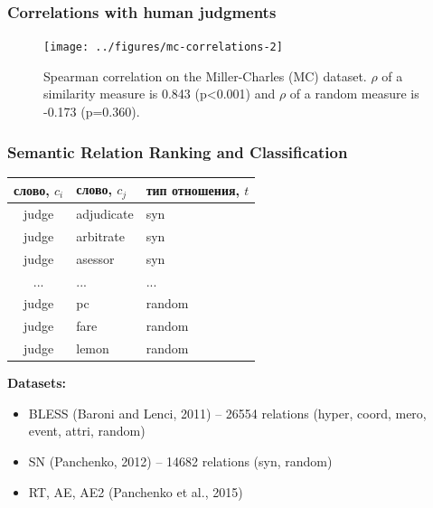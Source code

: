 \begin{frame}
\frametitle{Correlations with human judgments}

\begin{figure}
    \centering
        \texttt{[image: ../figures/mc-correlations-2]}
    \caption{ Spearman correlation on the Miller-Charles (MC) dataset. $\rho$ of a similarity measure is 0.843 (p<0.001) and $\rho$ of a random measure is -0.173 (p=0.360). }
    \label{fig:mc-correlations}
\end{figure}
\end{frame}






\begin{frame}
\frametitle{Semantic Relation Ranking and Classification}

{ \scriptsize

\begin{table}[h]\footnotesize
\begin{tabular}{ |c|l|l| }
\hline
\bf слово, $c_i$ & \bf  слово, $c_j$ & \bf тип отношения, $t$  \\ \hline \hline
judge & adjudicate & syn \\
judge & arbitrate & syn \\
judge & asessor & syn \\
... & ... & ...   \\
judge & pc & random \\ 
judge & fare & random \\
judge & lemon & random \\ \hline
\end{tabular}
\end {table}

}

\textbf{Datasets:}
\begin{itemize}
  \item BLESS (Baroni and Lenci, 2011)  -- 26554 relations (hyper, coord, mero, event, attri, random)  
  \item SN (Panchenko, 2012) -- 14682  relations (syn, random) 
 \item RT, AE, AE2 (Panchenko et al., 2015)

\end{itemize}

\end{frame}



